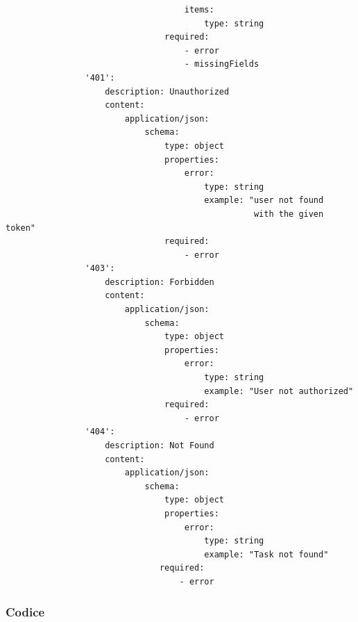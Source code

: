 \documentclass{report}
\begin{document}
\begin{verbatim}
                                    items:
                                        type: string
                                required:
                                    - error
                                    - missingFields
                '401':
                    description: Unauthorized
                    content:
                        application/json:
                            schema:
                                type: object
                                properties:
                                    error:
                                        type: string
                                        example: "user not found
                                                  with the given token"
                                required:
                                    - error
                '403':
                    description: Forbidden
                    content:
                        application/json:
                            schema:
                                type: object
                                properties:
                                    error:
                                        type: string
                                        example: "User not authorized"
                                required:
                                    - error
                '404':
                    description: Not Found
                    content:
                        application/json:
                            schema:
                                type: object
                                properties:
                                    error:
                                        type: string
                                        example: "Task not found"
                               required:
                                   - error
\end{verbatim}

\subsubsection*{Codice}
\end{document}
